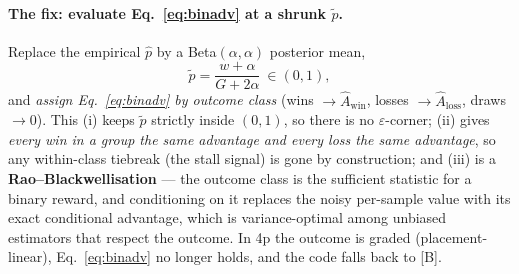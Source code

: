 \documentclass[11pt]{article}
\newcommand{\Adv}{\widehat{A}}
\begin{document}
\paragraph{The fix: evaluate Eq.~\eqref{eq:binadv} at a shrunk $\tilde p$.} Replace the empirical
$\hat p$ by a Beta$(\alpha,\alpha)$ posterior mean,
\begin{equation}
\tilde p=\frac{w+\alpha}{G+2\alpha}\ \in(0,1),
\label{eq:shrink}
\end{equation}
and \emph{assign Eq.~\eqref{eq:binadv} by outcome class} (wins $\to\Adv_{\mathrm{win}}$, losses
$\to\Adv_{\mathrm{loss}}$, draws $\to0$). This (i) keeps $\tilde p$ strictly inside $(0,1)$, so there is
no $\varepsilon$-corner; (ii) gives \emph{every win in a group the same advantage and every loss the
same advantage}, so any within-class tiebreak (the stall signal) is gone by construction; and (iii) is
a \textbf{Rao--Blackwellisation} --- the outcome class is the sufficient statistic for a binary reward,
and conditioning on it replaces the noisy per-sample value with its exact conditional advantage, which
is variance-optimal among unbiased estimators that respect the outcome. In 4p the outcome is graded
(placement-linear), Eq.~\eqref{eq:binadv} no longer holds, and the code falls back to [B].

\end{document}
